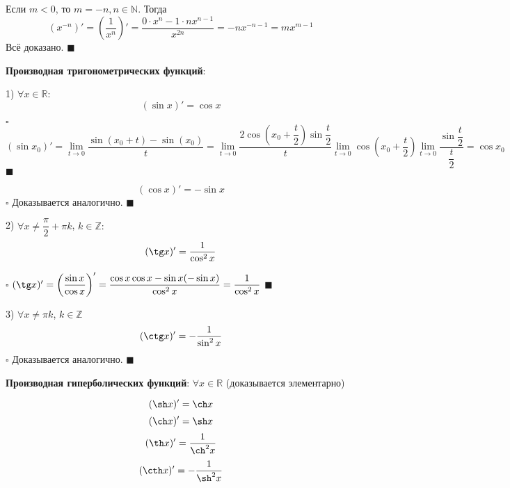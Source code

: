 \documentclass[12pt, a4paper, reqno]{article}
\begin{document}
    Если $m < 0$, то $m = -n, n\in\mathbb{N}$. Тогда
    \begin{equation*}
        (x^{-n})' = \left(\dfrac{1}{x^n}\right)' = \dfrac{0\cdot x^n - 1\cdot nx^{n - 1}}{x^{2n}} =
        -nx^{-n-1} = mx^{m - 1}
    \end{equation*}
    Всё доказано. $\blacksquare$

    \textbf{Производная тригонометрических функций}:

    1) $\forall x\in\mathbb{R}:$
    \begin{equation*}
        (\sin{x})' = \cos{x}
    \end{equation*}

    $\square$
    \begin{equation*}
        (\sin{x_0})' = \lim\limits_{t\to 0}\dfrac{\sin(x_0 + t) - \sin(x_0)}{t} =
        \lim\limits_{t\to 0}\dfrac{2\cos\left(x_0 + \dfrac{t}{2}\right)\sin{\dfrac{t}{2}}}{t}
        \lim\limits_{t\to 0}\cos\left(x_0 + \dfrac{t}{2}\right)
        \lim\limits_{t\to 0}\dfrac{\sin{\dfrac{t}{2}}}{\dfrac{t}{2}} = \cos{x_0}
    \end{equation*}
    $\blacksquare$

    \begin{equation*}
        (\cos{x})' = -\sin{x}
    \end{equation*}
    $\square$ Доказывается аналогично. $\blacksquare$

    2) $\forall x\neq \dfrac{\pi}{2} + \pi k$, $k\in\mathbb{Z}:$
    \begin{equation*}
        (\tg x)' = \dfrac{1}{\cos^2{x}}
    \end{equation*}

    $\square$ $(\tg x)' = \left(\dfrac{\sin{x}}{\cos{x}}\right)' =
    \dfrac{\cos{x}\cos{x} - \sin{x}(-\sin{x})}{\cos^2{x}} = \dfrac{1}{\cos^2{x}}$ $\blacksquare$

    3) $\forall x\neq \pi k$, $k\in\mathbb{Z}$
    \begin{equation*}
        (\ctg x)' = -\dfrac{1}{\sin^2{x}}
    \end{equation*}
    $\square$ Доказывается аналогично. $\blacksquare$

    \textbf{Производная гиперболических функций}: $\forall x\in\mathbb{R}$ (доказывается элементарно)

    \begin{equation*}
        (\sh x)' = \ch x
    \end{equation*}
    \begin{equation*}
        (\ch x)' = \sh x
    \end{equation*}
    \begin{equation*}
        (\th x)' = \dfrac{1}{\ch^2 x}
    \end{equation*}
    \begin{equation*}
        (\cth x)' = -\dfrac{1}{\sh^2 x}
    \end{equation*}
\end{document}
